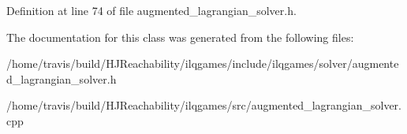 Definition at line 74 of file augmented\+\_\+lagrangian\+\_\+solver.\+h.



The documentation for this class was generated from the following files\+:\begin{DoxyCompactItemize}
\item 
/home/travis/build/\+H\+J\+Reachability/ilqgames/include/ilqgames/solver/augmented\+\_\+lagrangian\+\_\+solver.\+h\item 
/home/travis/build/\+H\+J\+Reachability/ilqgames/src/augmented\+\_\+lagrangian\+\_\+solver.\+cpp\end{DoxyCompactItemize}
